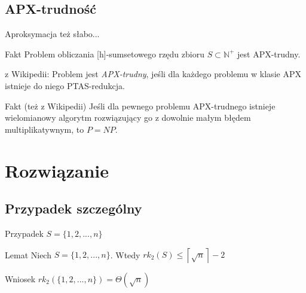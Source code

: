 \documentclass{beamer}
\newcommand{\N}{\mathbb{N}}
\begin{document}
	\subsection{APX-trudność}
		\begin{frame}{Aproksymacja też słabo...}
			\begin{exampleblock}{Fakt}
				Problem obliczania [h]-sumsetowego rzędu zbioru $ S \subset \N^{+} $ jest APX-trudny.
			\end{exampleblock}			
			
			\pause
			\begin{block}{z Wikipedii:}
				Problem jest \emph{APX-trudny}, jeśli dla każdego problemu w klasie APX istnieje do niego PTAS-redukcja.
			\end{block}						
			
			\pause
			\begin{exampleblock}{Fakt (też z Wikipedii)}
				Jeśli dla pewnego problemu APX-trudnego istnieje wielomianowy algorytm rozwiązujący go z dowolnie małym błędem multiplikatywnym, to $ P = NP $.
			\end{exampleblock}
			
		\end{frame}
		
\section{Rozwiązanie}
	\subsection{Przypadek szczególny}
		\begin{frame}{Przypadek $ S = \lbrace 1,2,...,n \rbrace $}
			\begin{exampleblock}{Lemat}			
				Niech $ S = \lbrace 1,2,...,n \rbrace $. Wtedy $ rk_{2}(S) \leq \left\lceil \sqrt{n} \right\rceil - 2 $
			\end{exampleblock}
						
			
			\pause			
			\vspace{\baselineskip}
			\begin{exampleblock}{Wniosek}			
				$ rk_{2}\left( \lbrace 1,2,...,n \rbrace \right) = \Theta(\sqrt{n}) $
			\end{exampleblock}
		\end{frame}
		
\end{document}
